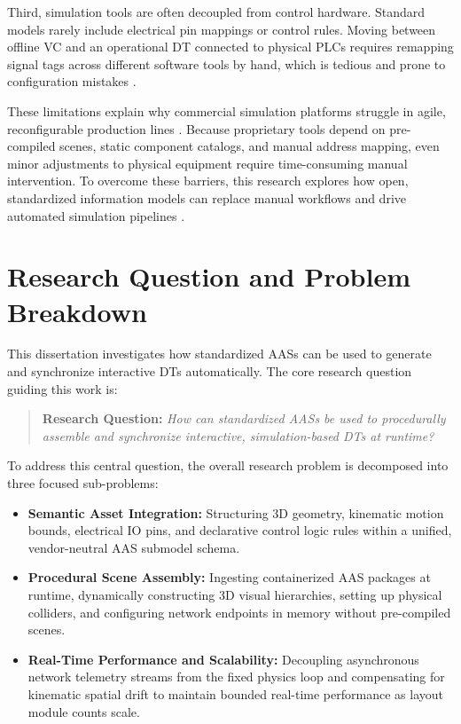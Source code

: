 Third, simulation tools are often decoupled from control hardware. Standard models rarely include electrical pin mappings or control rules. Moving between offline \gls{VC} and an operational \gls{DT} connected to physical \glspl{PLC} requires remapping signal tags across different software tools by hand, which is tedious and prone to configuration mistakes \cite{Striffler2023}.

These limitations explain why commercial simulation platforms struggle in agile, reconfigurable production lines \cite{Rocha2024}. Because proprietary tools depend on pre-compiled scenes, static component catalogs, and manual address mapping, even minor adjustments to physical equipment require time-consuming manual intervention. To overcome these barriers, this research explores how open, standardized information models can replace manual workflows and drive automated simulation pipelines \cite{Luder2020}.

\section{Research Question and Problem Breakdown}
\label{sec:rqs}

This dissertation investigates how standardized \glspl{AAS} can be used to generate and synchronize interactive \glspl{DT} automatically. The core research question guiding this work is:

\begin{quote}
    \textbf{Research Question:} \textit{How can standardized \glspl{AAS} be used to procedurally assemble and synchronize interactive, simulation-based \glspl{DT} at runtime?}
\end{quote}

To address this central question, the overall research problem is decomposed into three focused sub-problems:

\begin{itemize}
    \item \textbf{Semantic Asset Integration:} Structuring 3D geometry, kinematic motion bounds, electrical \gls{IO} pins, and declarative control logic rules within a unified, vendor-neutral \gls{AAS} submodel schema.

    \item \textbf{Procedural Scene Assembly:} Ingesting containerized \gls{AAS} packages at runtime, dynamically constructing 3D visual hierarchies, setting up physical colliders, and configuring network endpoints in memory without pre-compiled scenes.

    \item \textbf{Real-Time Performance and Scalability:} Decoupling asynchronous network telemetry streams from the fixed physics loop and compensating for kinematic spatial drift to maintain bounded real-time performance as layout module counts scale.
\end{itemize}

